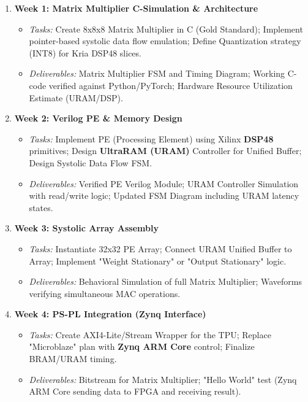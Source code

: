\documentclass[11pt,a4paper,twoside]{article}
\begin{document}
\begin{enumerate}
    \item \textbf{Week 1: Matrix Multiplier C-Simulation \& Architecture}
    \begin{itemize}
        \item \textit{Tasks:} Create 8x8x8 Matrix Multiplier in C (Gold Standard); Implement pointer-based systolic data flow emulation; Define Quantization strategy (INT8) for Kria DSP48 slices.
        \item \textit{Deliverables:} Matrix Multiplier FSM and Timing Diagram; Working C-code verified against Python/PyTorch; Hardware Resource Utilization Estimate (URAM/DSP).
    \end{itemize}

    \item \textbf{Week 2: Verilog PE \& Memory Design}
    \begin{itemize}
        \item \textit{Tasks:} Implement PE (Processing Element) using Xilinx \textbf{DSP48} primitives; Design \textbf{UltraRAM (URAM)} Controller for Unified Buffer; Design Systolic Data Flow FSM.
        \item \textit{Deliverables:} Verified PE Verilog Module; URAM Controller Simulation with read/write logic; Updated FSM Diagram including URAM latency states.
    \end{itemize}

    \item \textbf{Week 3: Systolic Array Assembly}
    \begin{itemize}
        \item \textit{Tasks:} Instantiate 32x32 PE Array; Connect URAM Unified Buffer to Array; Implement "Weight Stationary" or "Output Stationary" logic.
        \item \textit{Deliverables:} Behavioral Simulation of full Matrix Multiplier; Waveforms verifying simultaneous MAC operations.
    \end{itemize}

    \item \textbf{Week 4: PS-PL Integration (Zynq Interface)}
    \begin{itemize}
        \item \textit{Tasks:} Create AXI4-Lite/Stream Wrapper for the TPU; Replace "Microblaze" plan with \textbf{Zynq ARM Core} control; Finalize BRAM/URAM timing.
        \item \textit{Deliverables:} Bitstream for Matrix Multiplier; "Hello World" test (Zynq ARM Core sending data to FPGA and receiving result).
    \end{itemize}


\end{enumerate}
\end{document}
